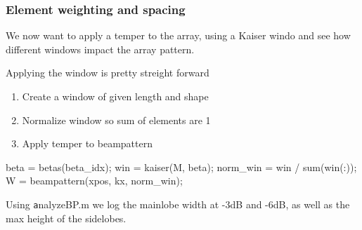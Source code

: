 \documentclass[compress]{beamer}
\begin{document}
\begin{frame}[fragile] %
    \frametitle{Element weighting and spacing}
    We now want to apply a temper to the array, using a Kaiser windo and see how
    different windows impact the array pattern.
    
    Applying the window is pretty streight forward
    \begin{enumerate}
        \item Create a window of given length and shape
        \item Normalize window so sum of elements are 1
        \item Apply temper to beampattern
    \end{enumerate}

    \begin{jllisting}[gobble=8,language=Matlab]
        beta = betas(beta_idx);
        win = kaiser(M, beta);
        norm_win = win / sum(win(:));
        W = beampattern(xpos, kx, norm_win);
    \end{jllisting}
    Using {\texttt analyzeBP.m} we log the mainlobe width at -3dB and -6dB, as
    well as the max height of the sidelobes.
\end{frame}
\end{document}
